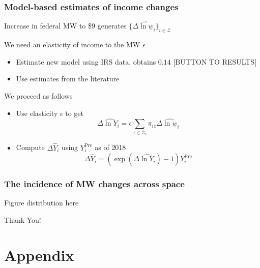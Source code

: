 \documentclass[aspectratio=169, t]{beamer}
\newcommand{\Z}{\mathcal{Z}}
\newcommand{\MW}{\underline{w}}
\begin{document}
\begin{frame}
	\frametitle{Model-based estimates of income changes}
	
	Increase in federal MW to \$9 generates $\{\Delta \hat{\ln \MW}_i\}_{i\in\Z}$
	
	\pause
	\vspace{3mm}
	We need an elasticity of income to the MW $\epsilon$
	\begin{itemize}
		\item Estimate new model using IRS data, obtains $0.14$ [BUTTON TO RESULTS]
		\vspace{1mm} 
		\item Use estimates from the literature \parencite{CegnizEtAl2019}
	\end{itemize}

	\pause
	\vspace{3mm}
	We proceed as follows
	\begin{itemize}
		\item Use elasticity $\epsilon$ to get
		\begin{equation*}
			\Delta \hat{\ln Y}_i = \epsilon \sum_{z\in\Z_i} \pi_{iz} \Delta \hat{\ln \MW}_i
		\end{equation*}
		\vspace{1mm} 
		\item Compute $\Delta \hat Y_i$ using $Y_i^{\text{Pre}}$ as of 2018
		$$\Delta \hat Y_i = \left(\exp(\Delta \hat{\ln Y_i}) - 1 \right) Y_i^{\text{Pre}}$$
	\end{itemize}
\end{frame}

\begin{frame}
	\frametitle{The incidence of MW changes across space}
	
	Figure distribution here
\end{frame}

\begin{frame}[c]
    \begin{center}
    	\Large Thank You!
    \end{center}
\end{frame}


\appendix

\renewcommand\thetable{\thesection.\arabic{table}} 
\renewcommand\thefigure{\thesection.\arabic{figure}} 
\setcounter{table}{0}
\setcounter{figure}{0}

\section{Appendix}
\end{document}
